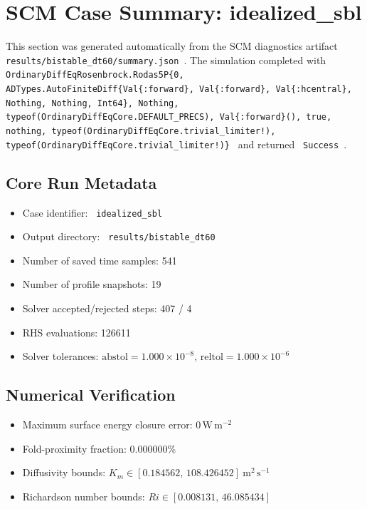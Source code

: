 \section{SCM Case Summary: idealized\_sbl}
\label{sec:scm_case_bistable_dt60_scm_case_report}

This section was generated automatically from the SCM diagnostics artifact
\texttt{ results/bistable\_dt60/summary.json }. The simulation completed with \texttt{ OrdinaryDiffEqRosenbrock.Rodas5P\{0, ADTypes.AutoFiniteDiff\{Val\{:forward\}, Val\{:forward\}, Val\{:hcentral\}, Nothing, Nothing, Int64\}, Nothing, typeof(OrdinaryDiffEqCore.DEFAULT\_PRECS), Val\{:forward\}(), true, nothing, typeof(OrdinaryDiffEqCore.trivial\_limiter!), typeof(OrdinaryDiffEqCore.trivial\_limiter!)\} }
and returned \texttt{ Success }.

\subsection{Core Run Metadata}
\begin{itemize}
  \item Case identifier: \texttt{ idealized\_sbl }
  \item Output directory: \texttt{ results/bistable\_dt60 }
  \item Number of saved time samples: 541
  \item Number of profile snapshots: 19
  \item Solver accepted/rejected steps: 407 / 4
  \item RHS evaluations: 126611
  \item Solver tolerances: $\mathrm{abstol}=1.000 \times 10^{-8}$, $\mathrm{reltol}=1.000 \times 10^{-6}$
\end{itemize}

\subsection{Numerical Verification}
\begin{itemize}
  \item Maximum surface energy closure error:
  $0\,\mathrm{W\,m^{-2}}$
  \item Fold-proximity fraction:
  $0.000000\%$
  \item Diffusivity bounds:
  $K_m \in [0.184562,\,108.426452]~\mathrm{m^2\,s^{-1}}$
  \item Richardson number bounds:
  $Ri \in [0.008131,\,46.085434]$
\end{itemize}

